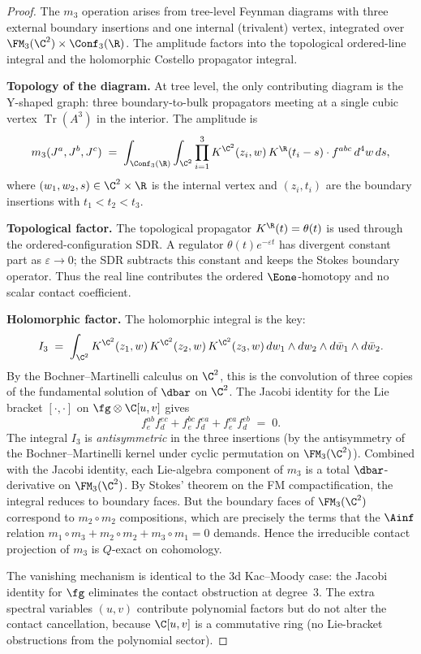 \begin{proof}
The $m_3$ operation arises from tree-level Feynman
diagrams with three external boundary insertions and one
internal (trivalent) vertex, integrated over
$\FM_3(\C^2) \times \Conf_3(\R)$. The amplitude factors into
the topological ordered-line integral and the holomorphic
Costello propagator integral.

\medskip\noindent\textbf{Topology of the diagram.}
At tree level, the only contributing diagram is the
Y-shaped graph: three boundary-to-bulk propagators
meeting at a single cubic vertex $\operatorname{Tr}(A^3)$ in
the interior. The amplitude is
\begin{equation}\label{eq:DDCA-m3-integral}
 m_3(J^a,J^b,J^c)
 \;=\;
 \int_{\Conf_3(\R)}
 \int_{\C^2}
 \prod_{i=1}^{3}
 K^{\C^2}(z_i, w)\,
 K^{\R}(t_i - s)
 \cdot
 f^{abc}\, d^4w\, ds,
\end{equation}
where $(w_1,w_2,s) \in \C^2 \times \R$ is the internal
vertex and $(z_i, t_i)$ are the boundary insertions with
$t_1 < t_2 < t_3$.

\medskip\noindent\textbf{Topological factor.}
The topological propagator $K^{\R}(t)=\theta(t)$ is used
through the ordered-configuration SDR. A regulator
$\theta(t)e^{-\varepsilon t}$ has divergent constant part as
$\varepsilon\to0$; the SDR subtracts this constant and keeps
the Stokes boundary operator. Thus the real line contributes
the ordered $\Eone$-homotopy and no scalar contact coefficient.

\medskip\noindent\textbf{Holomorphic factor.}
The holomorphic integral is the key:
\[
 I_3 \;=\;
 \int_{\C^2}
 K^{\C^2}(z_1,w)\,
 K^{\C^2}(z_2,w)\,
 K^{\C^2}(z_3,w)\,
 dw_1 \wedge dw_2 \wedge d\bar w_1 \wedge d\bar w_2.
\]
By the Bochner--Martinelli calculus on $\C^2$, this is
the convolution of three copies of the fundamental
solution of $\dbar$ on $\C^2$. The Jacobi identity for
the Lie bracket $[\cdot,\cdot]$ on
$\fg \otimes \C[u,v]$ gives
\[
 f^{ab}_e f^{ec}_d + f^{bc}_e f^{ea}_d
 + f^{ca}_e f^{eb}_d \;=\; 0.
\]
The integral $I_3$ is \emph{antisymmetric} in the three
insertions (by the antisymmetry of the
Bochner--Martinelli kernel under cyclic permutation on
$\FM_3(\C^2)$). Combined with the Jacobi identity,
each Lie-algebra component of $m_3$ is a total
$\dbar$-derivative on $\FM_3(\C^2)$. By Stokes'
theorem on the FM compactification, the integral reduces
to boundary faces. But the boundary faces of
$\FM_3(\C^2)$ correspond to $m_2 \circ m_2$
compositions, which are precisely the terms that the
$\Ainf$ relation
$m_1 \circ m_3 + m_2 \circ m_2 + m_3 \circ m_1 = 0$
demands. Hence the irreducible contact projection of $m_3$ is
$Q$-exact on cohomology.

The vanishing mechanism is identical to the 3d
Kac--Moody case: the Jacobi identity for $\fg$
eliminates the contact obstruction at degree~$3$. The extra
spectral variables $(u,v)$
contribute polynomial factors but do not alter the
contact cancellation, because $\C[u,v]$ is a commutative ring
(no Lie-bracket obstructions from the polynomial sector).
\end{proof}

